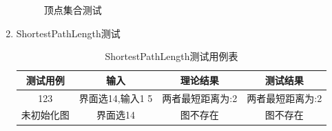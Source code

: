 \documentclass[supercite]{HustGraduPaper}
\theoremstyle{definition}
\begin{document}
\begin{enumerate}
\begin{figure}[htb]
		      \caption{顶点集合测试}
	      \end{figure}
	      \newpage
	\item ShortestPathLength测试
	      \begin{table}[htb]
		      \begin{center}
			      \setlength{\tabcolsep}{2.0mm}
			      \caption{ShortestPathLength测试用例表}
			      \label{t14}
			      \begin{tabular}{|c|c|c|c|}
				      \hline
				      测试用例   & 输入             & 理论结果         & 测试结果         \\
				      \hline
				      \hline
				      123        & 界面选14,输入1 5 & 两者最短距离为:2 & 两者最短距离为:2 \\
				      \hline
				      未初始化图 & 界面选14         & 图不存在         & 图不存在         \\
				      \hline
			      \end{tabular}
		      \end{center}
	      \end{table}
	      \begin{figure}[htb]
		      \centering
		      \quad
		      \\

\end{figure}
\end{enumerate}
\end{document}
